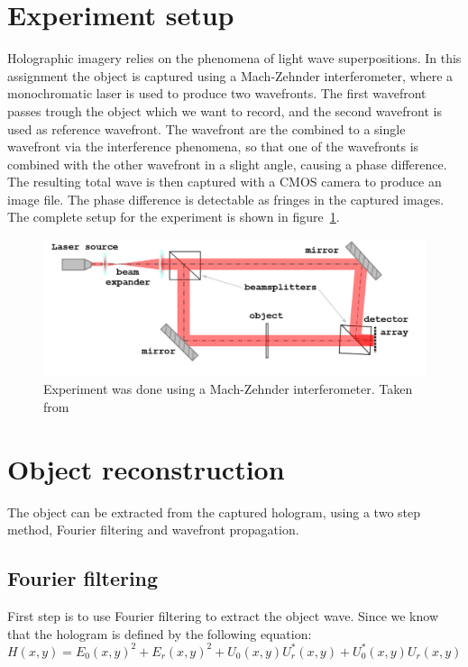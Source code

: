 \documentclass[12pt,a4paper,english
]{tunithesis}
\begin{document}
\section{Experiment setup}
Holographic imagery relies on the phenomena of light wave superpositions. In this assignment the object is captured using a Mach-Zehnder interferometer, where a monochromatic laser is used to produce two wavefronts. The first wavefront passes trough the object which we want to record, and the second wavefront is used as reference wavefront. The wavefront are the combined to a single wavefront via the interference phenomena, so that one of the wavefronts is combined with the other wavefront in a slight angle, causing a phase difference. The resulting total wave is then captured with a CMOS camera to produce an image file. The phase difference is detectable as fringes in the captured images. The complete setup for the experiment is shown in figure~\ref{fig:lab_setup}.

\begin{figure}
  \centering
  \includegraphics[width=\columnwidth]{img/lab_setup.png}
  \caption{Experiment was done using a Mach-Zehnder interferometer. Taken from~\cite{assignment}}
  \label{fig:lab_setup}
\end{figure}


\section{Object reconstruction}
The object can be extracted from the captured hologram, using a two step method, Fourier filtering and wavefront propagation.

\subsection{Fourier filtering}
First step is to use Fourier filtering to extract the object wave. Since we know that the hologram is defined by the following equation:
\begin{equation}
H(x, y) = E_0(x, y)^2 + E_r(x, y)^2 + U_0(x, y)U_r^*(x, y) + U_0^*(x, y)U_r(x, y)
\label{eq:hologram}
\end{equation}
\end{document}
